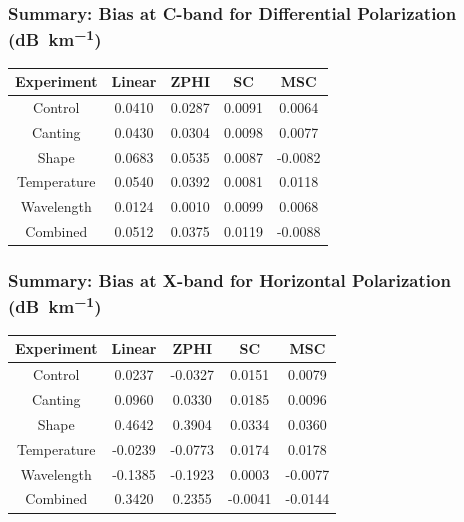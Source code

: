 \documentclass[red]{beamer}
\begin{document}
\begin{frame}
    \frametitle{Summary: Bias at C-band for Differential Polarization (\si{dB\per \kilo\meter})}
    \begin{center}
        \begin{tabular}{| c | c | c | c | c |}
            \hline
            Experiment & Linear & ZPHI & SC & MSC \\
            \hline
            \hline
            Control & 0.0410 & 0.0287 & 0.0091 & 0.0064 \\
            Canting & 0.0430 & 0.0304 & 0.0098 & 0.0077 \\
            Shape & 0.0683 & 0.0535 & 0.0087 & -0.0082 \\
            Temperature & 0.0540 & 0.0392 & 0.0081 & 0.0118 \\
            Wavelength & 0.0124 & 0.0010 & 0.0099 & 0.0068 \\
            Combined & 0.0512 & 0.0375 & 0.0119 & -0.0088 \\
            \hline
        \end{tabular}
    \end{center}
\end{frame}

\begin{frame}
    \frametitle{Summary: Bias at X-band for Horizontal Polarization (\si{dB\per \kilo\meter})}
    \begin{center}
        \begin{tabular}{| c | c | c | c | c |}
            \hline
            Experiment & Linear & ZPHI & SC & MSC \\
            \hline
            \hline
            Control & 0.0237 & -0.0327 & 0.0151 & 0.0079 \\
            Canting & 0.0960 & 0.0330 & 0.0185 & 0.0096 \\
            Shape & 0.4642 & 0.3904 & 0.0334 & 0.0360 \\
            Temperature & -0.0239 & -0.0773 & 0.0174 & 0.0178 \\
            Wavelength & -0.1385 & -0.1923 & 0.0003 & -0.0077 \\
            Combined & 0.3420 & 0.2355 & -0.0041 & -0.0144 \\
            \hline
        \end{tabular}
    \end{center}
\end{frame}
\end{document}

